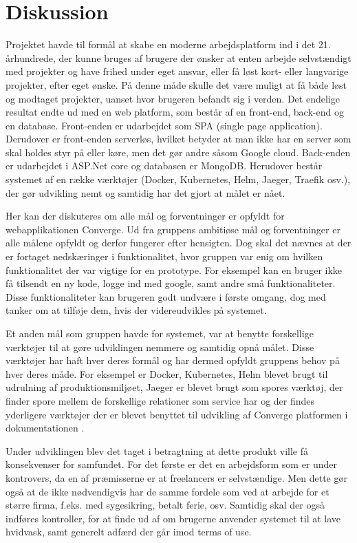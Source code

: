 \chapter{Diskussion}
\label{cha:discussion}

Projektet havde til formål at skabe en moderne arbejdsplatform ind i det 21. århundrede, der kunne bruges af brugere der ønsker at enten arbejde selvstændigt med projekter og have frihed under eget ansvar, eller få løst kort- eller langvarige projekter, efter eget ønske. På denne måde skulle det være muligt at få både løst og modtaget projekter, uanset hvor brugeren befandt sig i verden. Det endelige resultat endte ud med en web platform, som består af en front-end, back-end og en database. Front-enden er udarbejdet som SPA (single page application). Derudover er front-enden serverløs, hvilket betyder at man ikke har en server som skal holdes styr på eller køre, men det gør andre såsom Google cloud. Back-enden er udarbejdet i ASP.Net core og databasen er MongoDB. Herudover består systemet af en række værktøjer (Docker, Kubernetes, Helm, Jaeger, Traefik osv.), der gør udvikling nemt og samtidig har det gjort at målet er nået.

Her kan der diskuteres om alle mål og forventninger er opfyldt for webapplikationen Converge. Ud fra gruppens ambitiøse mål og forventninger er alle målene opfyldt og derfor fungerer efter hensigten. Dog skal det nævnes at der er fortaget nedskæringer i funktionalitet, hvor gruppen var enig om hvilken funktionalitet der var vigtige for en prototype. For eksempel kan en bruger ikke få tilsendt en ny kode, logge ind med google, samt andre små funktionaliteter. Disse funktionaliteter kan brugeren godt undvære i første omgang, dog med tanker om at tilføje dem, hvis der videreudvikles på systemet. 

Et anden mål som gruppen havde for systemet, var at benytte forskellige værktøjer til at gøre udviklingen nemmere og samtidig opnå målet. Disse værktøjer har haft hver deres formål og har dermed opfyldt gruppens behov på hver deres måde. For eksempel er Docker, Kubernetes, Helm blevet brugt til udrulning af produktionsmiljøet, Jaeger er blevet brugt som spores værktøj, der finder spore mellem de forskellige relationer som service har og der findes yderligere værktøjer der er blevet benyttet til udvikling af Converge platformen i dokumentationen \cite{Research}.

Under udviklingen blev det taget i betragtning at dette produkt ville få konsekvenser for samfundet. For det første er det en arbejdsform som er under kontrovers, da en af præmisserne er at freelancers er selvstændige. Men dette gør også at de ikke nødvendigvis har de samme fordele som ved at arbejde for et større firma, f.eks. med sygesikring, betalt ferie, osv. Samtidig skal der også indføres kontroller, for at finde ud af om brugerne anvender systemet til at lave hvidvask, samt generelt adfærd der går imod terms of use.

